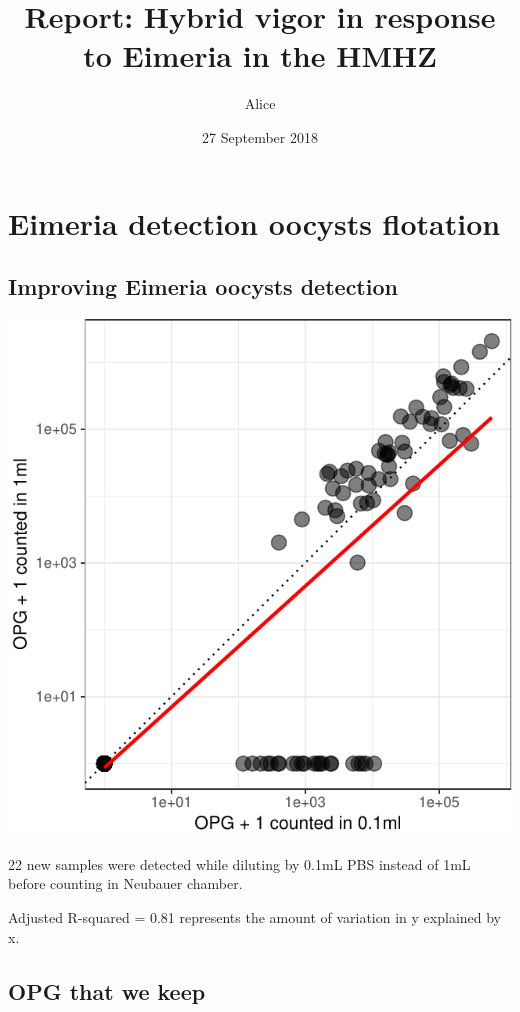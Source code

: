\documentclass[]{article}
\title{Report: Hybrid vigor in response to Eimeria in the HMHZ}
\author{Alice}
\date{27 September 2018}
\begin{document}
\maketitle

{
\setcounter{tocdepth}{4}
\tableofcontents
}
\section{Eimeria detection oocysts
flotation}\label{eimeria-detection-oocysts-flotation}

\subsection{Improving Eimeria oocysts
detection}\label{improving-eimeria-oocysts-detection}

\includegraphics{Data_Analysis_Alice_files/figure-latex/oocystsDetec-1.pdf}

22 new samples were detected while diluting by 0.1mL PBS instead of 1mL
before counting in Neubauer chamber.

Adjusted R-squared = 0.81 represents the amount of variation in y
explained by x.

\subsection{OPG that we keep}\label{opg-that-we-keep}
\end{document}
